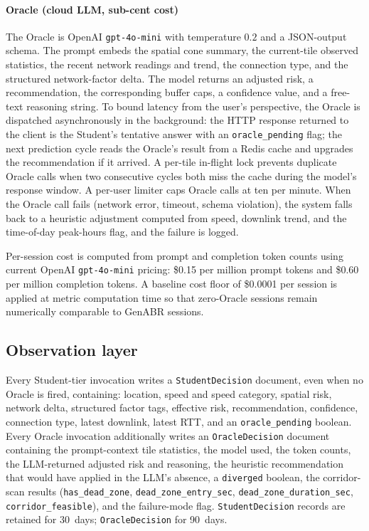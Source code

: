 \documentclass[conference]{IEEEtran}
\begin{document}
\paragraph{Oracle (cloud LLM, sub-cent cost)}
The Oracle is OpenAI \texttt{gpt-4o-mini} with temperature $0.2$ and a
JSON-output schema. The prompt embeds the spatial cone summary, the
current-tile observed statistics, the recent network readings and trend,
the connection type, and the structured network-factor delta. The model
returns an adjusted risk, a recommendation, the corresponding buffer
caps, a confidence value, and a free-text reasoning string. To bound
latency from the user's perspective, the Oracle is dispatched
asynchronously in the background: the HTTP response returned to the
client is the Student's tentative answer with an
\texttt{oracle\_pending} flag; the next prediction cycle reads the
Oracle's result from a Redis cache and upgrades the recommendation if it
arrived. A per-tile in-flight lock prevents duplicate Oracle calls when
two consecutive cycles both miss the cache during the model's response
window. A per-user limiter caps Oracle calls at ten per minute. When the
Oracle call fails (network error, timeout, schema violation), the system
falls back to a heuristic adjustment computed from speed, downlink
trend, and the time-of-day peak-hours flag, and the failure is logged.

Per-session cost is computed from prompt and completion token counts using
current OpenAI \texttt{gpt-4o-mini} pricing: \$0.15 per million prompt
tokens and \$0.60 per million completion tokens. A baseline cost floor of
\$0.0001 per session is applied at metric computation time so that
zero-Oracle sessions remain numerically comparable to GenABR sessions.

\subsection{Observation layer}
Every Student-tier invocation writes a \texttt{StudentDecision} document,
even when no Oracle is fired, containing: location, speed and speed
category, spatial risk, network delta, structured factor tags, effective
risk, recommendation, confidence, connection type, latest downlink,
latest RTT, and an \texttt{oracle\_pending} boolean. Every Oracle
invocation additionally writes an \texttt{OracleDecision} document
containing the prompt-context tile statistics, the model used, the token
counts, the LLM-returned adjusted risk and reasoning, the heuristic
recommendation that would have applied in the LLM's absence, a
\texttt{diverged} boolean, the corridor-scan results
(\texttt{has\_dead\_zone}, \texttt{dead\_zone\_entry\_sec},
\texttt{dead\_zone\_duration\_sec}, \texttt{corridor\_feasible}), and
the failure-mode flag. \texttt{StudentDecision} records are retained for
30~days; \texttt{OracleDecision} for 90~days.
\end{document}
